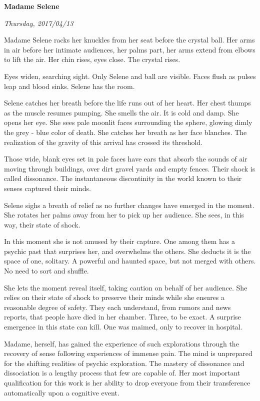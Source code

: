 

\centerline{\bf Madame Selene}
\centerline{\it Thursday, 2017/04/13}

\vfill
\break

Madame Selene racks her knuckles from her seat before the crystal
ball.  Her arms in air before her intimate audiences, her palms part,
her arms extend from elbows to lift the air.  Her chin rises, eyes
close.  The crystal rises.

Eyes widen, searching sight.  Only Selene and ball are visible.  Faces
flush as pulses leap and blood sinks.  Selene has the room.

\vfill
\break

Selene catches her breath before the life runs out of her heart.  Her
chest thumps as the muscle resumes pumping.  She smells the air.  It
is cold and damp.  She opens her eye.  She sees pale moonlit faces
surrounding the sphere, glowing dimly the grey - blue color of death.
She catches her breath as her face blanches.  The realization of the
gravity of this arrival has crossed its threshold.

\vfill
\break

Those wide, blank eyes set in pale faces have ears that absorb the
sounds of air moving through buildings, over dirt gravel yards and
empty fences.  Their shock is called dissonance.  The instantaneous
discontinity in the world known to their senses captured their minds.

Selene sighs a breath of relief as no further changes have emerged in
the moment.  She rotates her palms away from her to pick up her
audience.  She sees, in this way, their state of shock.  

\vfill
\break

In this moment she is not amused by their capture.  One among them has
a psychic past that surprises her, and overwhelms the others.  She
deducts it is the space of one, solitary.  A powerful and haunted
space, but not merged with others.  No need to sort and shuffle.

She lets the moment reveal itself, taking caution on behalf of her
audience.  She relies on their state of shock to preserve their minds
while she ensures a reasonable degree of safety.  They each
understand, from rumors and news reports, that people have died in her
chamber.  Three, to be exact.  A surprise emergence in this state can
kill.  One was maimed, only to recover in hospital.

Madame, herself, has gained the experience of such explorations
through the recovery of sense following experiences of immense pain.
The mind is unprepared for the shifting realities of psychic
exploration.  The mastery of dissonance and dissociation is a lengthy
process that few are capable of.  Her most important qualification for
this work is her ability to drop everyone from their transference
automatically upon a cognitive event.

